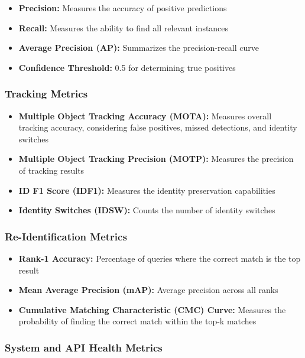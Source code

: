 \begin{itemize}
    \item \textbf{Precision:} Measures the accuracy of positive predictions
    \item \textbf{Recall:} Measures the ability to find all relevant instances
    \item \textbf{Average Precision (AP):} Summarizes the precision-recall curve
    \item \textbf{Confidence Threshold:} 0.5 for determining true positives
\end{itemize}

\subsubsection{Tracking Metrics}
\label{subsubsection:tracking-metrics}

\begin{itemize}
    \item \textbf{Multiple Object Tracking Accuracy (MOTA):} Measures overall tracking accuracy, considering false positives, missed detections, and identity switches
    \item \textbf{Multiple Object Tracking Precision (MOTP):} Measures the precision of tracking results
    \item \textbf{ID F1 Score (IDF1):} Measures the identity preservation capabilities
    \item \textbf{Identity Switches (IDSW):} Counts the number of identity switches
\end{itemize}

\subsubsection{Re-Identification Metrics}
\label{subsubsection:reid-metrics}

\begin{itemize}
    \item \textbf{Rank-1 Accuracy:} Percentage of queries where the correct match is the top result
    \item \textbf{Mean Average Precision (mAP):} Average precision across all ranks
    \item \textbf{Cumulative Matching Characteristic (CMC) Curve:} Measures the probability of finding the correct match within the top-k matches
\end{itemize}

\subsubsection{System and API Health Metrics}
\label{subsubsection:system-api-metrics}

